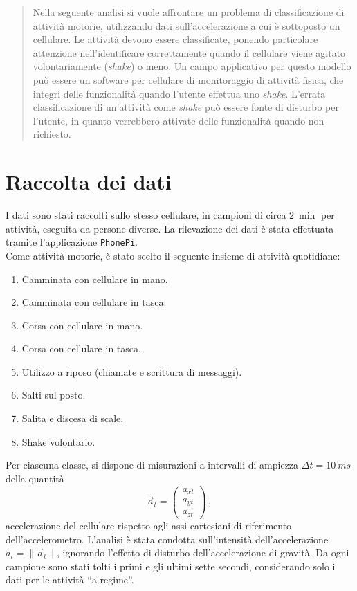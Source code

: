 \documentclass[./main.tex]{subfiles}
\begin{document}
\begin{abstract}
\normalsize
Nella seguente analisi si vuole affrontare un problema di classificazione di attività motorie, utilizzando dati sull'accelerazione a cui è sottoposto un cellulare. Le attività devono essere classificate, ponendo particolare attenzione nell'identificare correttamente quando il cellulare viene agitato volontariamente ({\em shake}) o meno. Un campo applicativo per questo modello può essere un software per cellulare di monitoraggio di attività fisica, che integri delle funzionalità quando l'utente effettua uno {\em shake}. L'errata classificazione di un'attività come {\em shake} può essere fonte di disturbo per l'utente, in quanto verrebbero attivate delle funzionalità quando non richiesto.
\end{abstract}
\section{Raccolta dei dati}
I dati sono stati raccolti sullo stesso cellulare, in campioni di circa $\SI{2}{\min}$ per attività, eseguita da persone diverse. La rilevazione dei dati è stata effettuata tramite l'applicazione \texttt{PhonePi}\cite{kumarPhonePiSampleServer2019}.\\
Come attività motorie, è stato scelto il seguente insieme di attività quotidiane:
\begin{enumerate}
	\item Camminata con cellulare in mano.
	\item Camminata con cellulare in tasca.
	\item Corsa con cellulare in mano.
	\item Corsa con cellulare in tasca.
	\item Utilizzo a riposo (chiamate e scrittura di messaggi).
	\item Salti sul posto.
	\item Salita e discesa di scale.
	\item Shake volontario.
\end{enumerate}
Per ciascuna classe, si dispone di misurazioni a intervalli di ampiezza $\Delta t = \SI{10}{ms}$ della quantità
$$
\vec{a}_t = \begin{pmatrix}
a_{xt}\\
a_{yt}\\
a_{zt}
\end{pmatrix}\,,
$$
accelerazione del cellulare rispetto agli assi cartesiani di riferimento dell'accelerometro. L'analisi è stata condotta sull'intensità dell'accelerazione $a_t = \|\vec{a}_t\|$, ignorando l'effetto di disturbo dell'accelerazione di gravità. Da ogni campione sono stati tolti i primi e gli ultimi sette secondi, considerando solo i dati per le attività ``a regime''.
\end{document}

